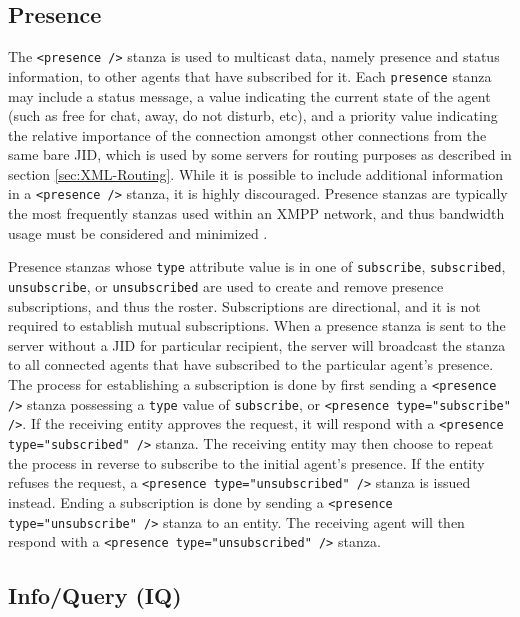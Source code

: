 \subsection{Presence}
\label{sec:Presence}

The \texttt{<presence />} stanza is used to multicast data, namely presence
and status information, to other agents that have subscribed for it. Each
\texttt{presence} stanza may include a status message, a value indicating the
current state of the agent (such as free for chat, away, do not disturb, etc),
and a priority value indicating the relative importance of the connection
amongst other connections from the same bare JID, which is used by some servers
for routing purposes as described in section \ref{sec:XML-Routing}. While it is
possible to include additional information in a \texttt{<presence />} stanza,
it is highly discouraged. Presence stanzas are typically the most frequently
stanzas used within an XMPP network, and thus bandwidth usage must be considered
and minimized \cite{XMPP-Presence}.

Presence stanzas whose \texttt{type} attribute value is in one of
\texttt{subscribe}, \texttt{subscribed}, \texttt{unsubscribe}, or
\texttt{unsubscribed} are used to create and remove presence subscriptions,
and thus the roster. Subscriptions are directional, and it is not required
to establish mutual subscriptions. When a presence stanza is sent to the
server without a JID for particular recipient, the server will broadcast
the stanza to all connected agents that have subscribed to the particular
agent's presence. The process for establishing a subscription is done by
first sending a \texttt{<presence />} stanza possessing a \texttt{type} value
of \texttt{subscribe}, or \texttt{<presence type="subscribe" />}. If the
receiving entity approves the request, it will respond with a \texttt{<presence
type="subscribed" />} stanza. The receiving entity may then choose to repeat
the process in reverse to subscribe to the initial agent's presence. If the
entity refuses the request, a \texttt{<presence type="unsubscribed" />} stanza
is issued instead. Ending a subscription is done by sending a \texttt{<presence
type="unsubscribe" />} stanza to an entity. The receiving agent will then
respond with a \texttt{<presence type="unsubscribed" />} stanza.


\subsection{Info/Query (IQ)}
\label{sec:Iq}

